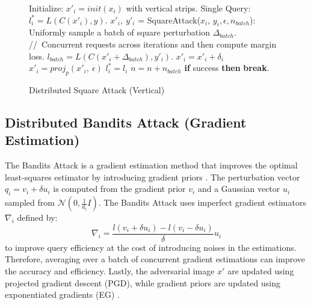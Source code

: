 \begin{figure}[H]
\begin{minipage}{\textwidth}
\begin{algorithm}[H]
    \centering
    \caption{Distributed Square Attack (Vertical)}
    \label{alg:square_vertical}
    \begin{algorithmic}[1]
            \State Initialize: $x'_{i} = init(x_{i})$ with vertical strips.
            \State Single Query: $l^{*}_i = L(C(x'_i), y)$.
            \State $x'_{i},\ y'_{i}$ = SquareAttack($x_{i}$, $y_{i},\epsilon, n_{batch}$):
            \Indent
                \For {each iteration $n \in [0,\ n_{iter})$}
                    \State Uniformly sample a batch of square perturbation $\Delta_{batch}$.
                    \State //\ Concurrent requests across iterations and then compute margin loss.
                    \State $l_{batch} = L(C(x'_i + \Delta_{batch}), y'_i)$.
                            \State $x'_i = x'_i + \delta_i$
                            \State $x'_i = proj_{p}(x'_i,\ \epsilon)$
                            \State $l^{*}_i = l_i$
                        \EndIf
                    \EndFor
                    \State $n = n + n_{batch}$
                    \State \textbf{if} {success} \textbf{then} {\textbf{break}}.
                \EndFor
            \EndIndent
        \EndFor
    \end{algorithmic}
\end{algorithm}
\end{minipage}
\end{figure}


\subsection{Distributed Bandits Attack (Gradient Estimation)}

The Bandits Attack is a gradient estimation method that improves the optimal least-squares estimator by introducing gradient priors \citep{ilyas2018prior}. The perturbation vector $q_i=v_i+\delta u_i$ is computed from the gradient prior $v_i$ and a Gaussian vector $u_i$ sampled from $\mathcal{N}(0, \frac{1}{d_i}I)$. The Bandits Attack uses imperfect gradient estimators $\nabla_i$ defined by: 
$$\nabla_i= \frac{l(v_i+\delta u_i)-l(v_i-\delta u_i)}{\delta} u_i$$ 
to improve query efficiency at the cost of introducing noises in the estimations. Therefore, averaging over a batch of concurrent gradient estimations can improve the accuracy and efficiency. Lastly, the adversarial image $x'$ are updated using projected gradient descent (PGD), while gradient priors are updated using exponentiated gradients (EG) \citep{pmlr-v117-ghai20a}.

